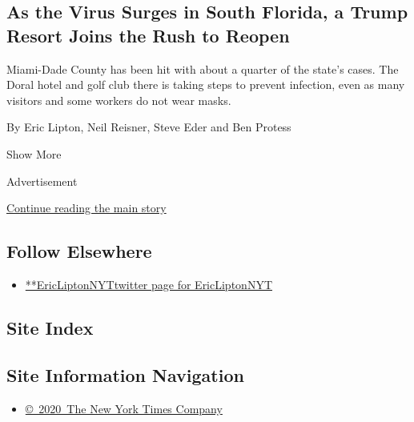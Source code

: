 \begin{enumerate}
  \hypertarget{as-the-virus-surges-in-south-florida-a-trump-resort-joins-the-rush-to-reopen}{%
  \subsection{As the Virus Surges in South Florida, a Trump Resort Joins
  the Rush to
  Reopen}\label{as-the-virus-surges-in-south-florida-a-trump-resort-joins-the-rush-to-reopen}}

  Miami-Dade County has been hit with about a quarter of the state's
  cases. The Doral hotel and golf club there is taking steps to prevent
  infection, even as many visitors and some workers do not wear masks.

  By Eric Lipton, Neil Reisner, Steve Eder and Ben Protess
\end{enumerate}

Show More

Advertisement

\protect\hyperlink{after-mid2}{Continue reading the main story}

\hypertarget{follow-elsewhere}{%
\subsection{Follow Elsewhere}\label{follow-elsewhere}}

\begin{itemize}
\tightlist
\item
  \href{https://twitter.com/EricLiptonNYT}{**EricLiptonNYTtwitter page
  for EricLiptonNYT}
\end{itemize}

\hypertarget{site-index}{%
\subsection{Site Index}\label{site-index}}

\hypertarget{site-information-navigation}{%
\subsection{Site Information
Navigation}\label{site-information-navigation}}

\begin{itemize}
\tightlist
\item
  \href{https://help.nytimes3xbfgragh.onion/hc/en-us/articles/115014792127-Copyright-notice}{©~2020~The
  New York Times Company}
\end{itemize}


